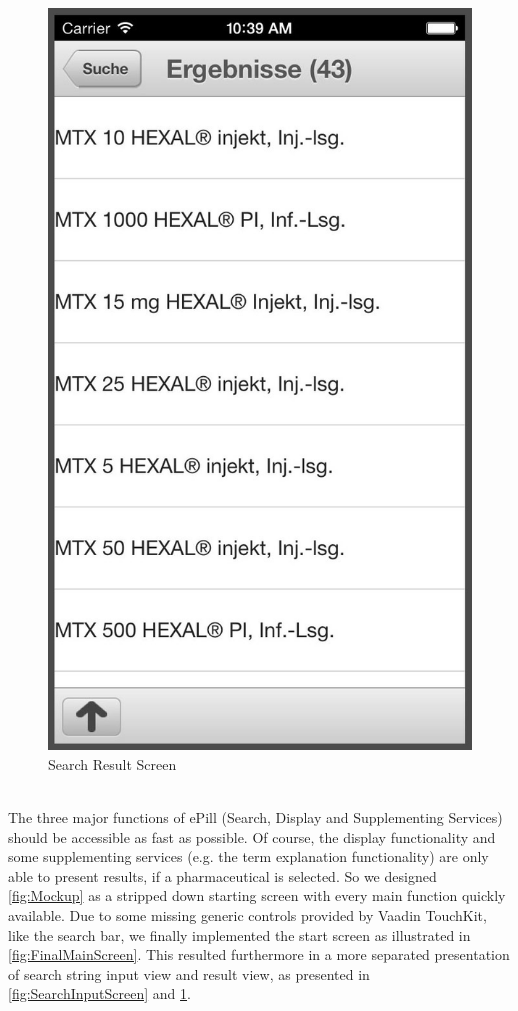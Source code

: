 \begin{figure}[ptbh]
\begin{minipage}[b]{0.45\linewidth}
        \includegraphics[width=0.8025\linewidth]{figures/Results_bw.jpg}
        \caption[Search Result Screen]{Search Result Screen}
        \label{fig:SearchResultScreen}
    \end{minipage}
\end{figure}
\\
The three major functions of ePill (Search, Display and Supplementing Services) should be accessible as fast as possible. Of course, the display functionality and some supplementing services (e.g. the term explanation functionality) are only able to present results, if a pharmaceutical is selected. So we designed \ref{fig:Mockup} as a stripped down starting screen with every main function quickly available. Due to some missing generic controls provided by Vaadin TouchKit, like the search bar, we finally implemented the start screen as illustrated in \ref{fig:FinalMainScreen}. This resulted furthermore in a more separated presentation of search string input view and result view, as presented in \ref{fig:SearchInputScreen} and \ref{fig:SearchResultScreen}.
